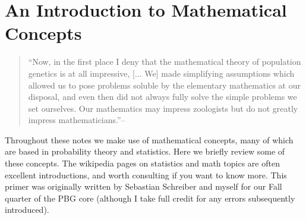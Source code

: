 % 
% 
% 


\chapter{An Introduction to Mathematical Concepts}
\begin{quote}
``Now, in the first place I deny that the mathematical theory of
population genetics is at all impressive, [... We] made simplifying assumptions which allowed us to pose problems
soluble by the elementary mathematics at our disposal, and even then
did not always fully solve the simple problems we set ourselves. Our
mathematics may impress zoologists but do not greatly impress
mathematicians.''--\citeauthor{haldane1964defense} 
\end{quote}

Throughout these notes we make use of mathematical concepts, many of
which are based in probability theory and statistics. Here we briefly
review some of these concepts. The wikipedia pages on
statistics and math topics are often excellent introductions, and
worth consulting if you want to know more. This primer was originally written by
Sebastian Schreiber and myself for our Fall quarter of the PBG core
(although I take full credit for any errors subsequently introduced).



